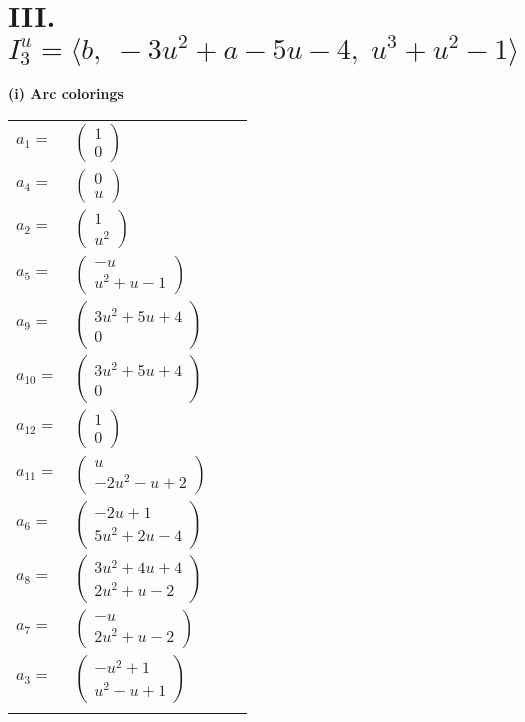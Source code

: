 \documentclass[1p]{elsarticle_modified}
\theoremstyle{definition}
\begin{document}
\centering \section*{III. $I^u_{3}= \langle b,\;-3 u^2+a-5 u-4,\;u^3+u^2-1 \rangle$}
\flushleft \textbf{(i) Arc colorings}\\
\begin{tabular}{m{7pt} m{180pt} m{7pt} m{180pt} }
\flushright $a_{1}=$&$\begin{pmatrix}1\\0\end{pmatrix}$ \\
\flushright $a_{4}=$&$\begin{pmatrix}0\\u\end{pmatrix}$ \\
\flushright $a_{2}=$&$\begin{pmatrix}1\\u^2\end{pmatrix}$ \\
\flushright $a_{5}=$&$\begin{pmatrix}- u\\u^2+u-1\end{pmatrix}$ \\
\flushright $a_{9}=$&$\begin{pmatrix}3 u^2+5 u+4\\0\end{pmatrix}$ \\
\flushright $a_{10}=$&$\begin{pmatrix}3 u^2+5 u+4\\0\end{pmatrix}$ \\
\flushright $a_{12}=$&$\begin{pmatrix}1\\0\end{pmatrix}$ \\
\flushright $a_{11}=$&$\begin{pmatrix}u\\-2 u^2- u+2\end{pmatrix}$ \\
\flushright $a_{6}=$&$\begin{pmatrix}-2 u+1\\5 u^2+2 u-4\end{pmatrix}$ \\
\flushright $a_{8}=$&$\begin{pmatrix}3 u^2+4 u+4\\2 u^2+u-2\end{pmatrix}$ \\
\flushright $a_{7}=$&$\begin{pmatrix}- u\\2 u^2+u-2\end{pmatrix}$ \\
\flushright $a_{3}=$&$\begin{pmatrix}- u^2+1\\u^2- u+1\end{pmatrix}$\\&\end{tabular}
\end{document}
